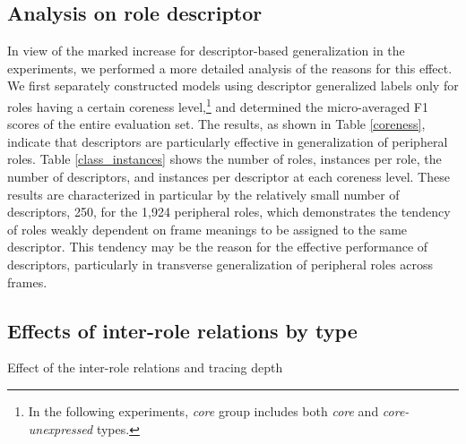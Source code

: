 \documentclass[english]{jnlp_1.4_rep}
\begin{document}
\subsection{Analysis on role descriptor}

In view of the marked increase for descriptor-based generalization in the experiments, we performed a more detailed analysis of the reasons for this effect. We first separately constructed models using descriptor generalized labels only for roles having a certain coreness level,\footnote{In the following experiments, {\it core} group includes both {\it core} and {\it core-unexpressed} types.} and determined the micro-averaged F1 scores of the entire evaluation set. The results, as shown in Table \ref{coreness}, indicate that descriptors are particularly effective in generalization of peripheral roles. Table \ref{class_instances} shows the number of roles, instances per role, the number of descriptors, and instances per descriptor at each coreness level. These results are characterized in particular by the relatively small number of descriptors, 250, for the 1,924 peripheral roles, which demonstrates the tendency of roles weakly dependent on frame meanings to be assigned to the same descriptor. This tendency may be the reason for the effective performance of descriptors, particularly in transverse generalization of peripheral roles across frames.

\begin{table}[b]
\begin{minipage}{118pt}
\setlength{\captionwidth}{118pt}
\label{coreness}

\end{minipage}
\hfill
\begin{minipage}{291pt}
\setlength{\captionwidth}{291pt}
\label{class_instances}

\end{minipage}
\end{table}


\subsection{Effects of inter-role relations by type}
\label{sec:compare-hierarchical-relation}

\begin{table}[b]
\caption{Effect of the inter-role relations and tracing depth}
\label{relation-accuracy}

\end{table}
\end{document}
